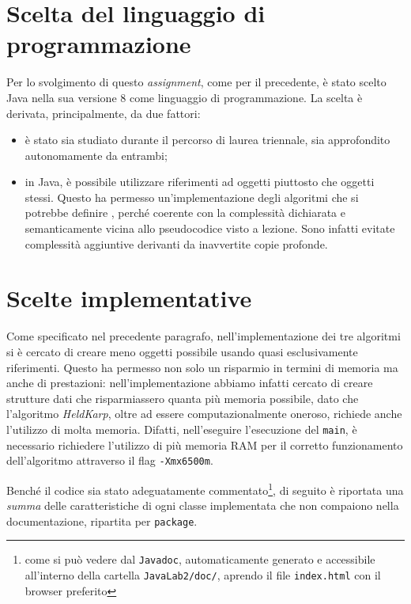 \section{Scelta del linguaggio di programmazione}
Per lo svolgimento di questo \emph{assignment}, come per il precedente, è stato scelto Java nella sua versione 8 come linguaggio di programmazione. La scelta è derivata, principalmente, da due fattori: 
\begin{itemize}
	\item è stato sia studiato durante il percorso di laurea triennale, sia approfondito autonomamente da entrambi;
	\item in Java, è possibile utilizzare riferimenti ad oggetti piuttosto che oggetti stessi. Questo ha permesso un'implementazione degli algoritmi che si potrebbe definire , perché coerente con la complessità dichiarata e semanticamente vicina allo pseudocodice visto a lezione. Sono infatti evitate complessità aggiuntive derivanti da inavvertite copie profonde.
\end{itemize}

\section{Scelte implementative}
Come specificato nel precedente paragrafo, nell'implementazione dei tre algoritmi si è cercato di creare meno oggetti possibile usando quasi esclusivamente riferimenti. Questo ha permesso non solo un risparmio in termini di memoria ma anche di prestazioni: nell'implementazione abbiamo infatti cercato di creare strutture dati che risparmiassero quanta più memoria possibile, dato che l'algoritmo \textit{HeldKarp}, oltre ad essere computazionalmente oneroso, richiede anche l'utilizzo di molta memoria. Difatti, nell'eseguire l'esecuzione del \texttt{main}, è necessario richiedere l'utilizzo di più memoria RAM per il corretto funzionamento dell'algoritmo attraverso il flag \texttt{-Xmx6500m}.

Benché il codice sia stato adeguatamente commentato\footnote{come si può vedere dal \texttt{Javadoc}, automaticamente generato e accessibile all'interno della cartella \texttt{JavaLab2/doc/}, aprendo il file \texttt{index.html} con il browser preferito}, di seguito è riportata una \emph{summa} delle caratteristiche di ogni classe implementata che non compaiono nella documentazione, ripartita per \texttt{package}.

